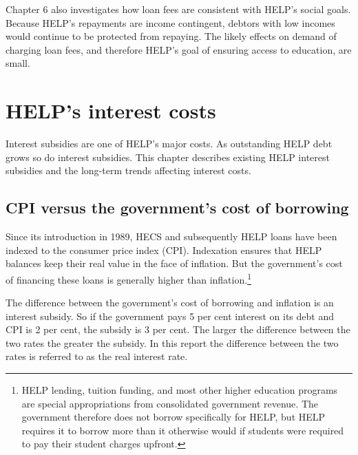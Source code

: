 \documentclass[embargoed]{grattan}
\begin{document}
Chapter 6 also investigates how loan fees are consistent with HELP's social goals. Because HELP's repayments are income contingent, debtors with low incomes would continue to be protected from repaying. The likely effects on demand of charging loan fees, and therefore HELP's goal of ensuring access to education, are small.

\chapter{}\label{section}

\chapter{\texorpdfstring{\protect\hypertarget{_Ref333151488}{}{\protect\hypertarget{_Ref333151510}{}{\protect\hypertarget{_Toc341784481}{}{\protect\hypertarget{_Ref309722967}{}{}}}}HELP's interest costs}{HELP's interest costs}}\label{helps-interest-costs}

Interest subsidies are one of HELP's major costs. As outstanding HELP debt grows so do interest subsidies. This chapter describes existing HELP interest subsidies and the long-term trends affecting interest costs.

\section{CPI versus the government's cost of borrowing}\label{cpi-versus-the-governments-cost-of-borrowing}

\protect\hypertarget{_Ref332899615}{}{\protect\hypertarget{_Ref332978906}{}{}}Since its introduction in 1989, HECS and subsequently HELP loans have been indexed to the consumer price index (CPI). Indexation ensures that HELP balances keep their real value in the face of inflation. But the government's cost of financing these loans is generally higher than inflation.\footnote{HELP lending, tuition funding, and most other higher education programs are special appropriations from consolidated government revenue. The government therefore does not borrow specifically for HELP, but HELP requires it to borrow more than it otherwise would if students were required to pay their student charges upfront.}

The difference between the government's cost of borrowing and inflation is an interest subsidy. So if the government pays 5 per cent interest on its debt and CPI is 2 per cent, the subsidy is 3 per cent. The larger the difference between the two rates the greater the subsidy. In this report the difference between the two rates is referred to as the real interest rate.
\end{document}
